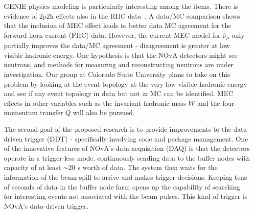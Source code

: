 \documentclass[a4paper, 11pt]{article} %
\begin{document}
GENIE physics modeling is particularly interesting among the items. There is evidence of 2p2h effects also in the RHC data~\cite{Bashar:2016_1}. A data/MC comparison shows that the inclusion of MEC effect leads to better data MC agreement for the forward horn current (FHC) data. However, the current MEC model for $\bar{\nu}_\mu$ only partially improves the data/MC agreement - disagreement is greater at low visible hadronic energy. One hypothesis is that the NOvA detectors might see neutrons, and methods for measuring and reconstructing neutrons are under investigation. Our group at Colorado State University plans to take on this problem by looking at the event topology at the very low visible hadronic energy and see if any event topology in data but not in MC can be identified. MEC effects in other variables such as the invariant hadronic mass $W$ and the four-momentum transfer $Q$ will also be pursued.\newline

The second goal of the proposed research is to provide improvements to the data-driven trigger (DDT) - specifically involving code and package management. One of the innovative features of NOvA's data acquisition (DAQ) is that the detectors operate in a trigger-less mode, continuously sending data to the buffer nodes with capacity of at least $\sim 20$ s worth of data. The system then waits for the information of the beam spill to arrive and makes trigger decisions. Keeping tens of seconds of data in the buffer node farm opens up the capability of searching for interesting events not associated with the beam pulses. This kind of trigger is NOvA's data-driven trigger.
\end{document}
